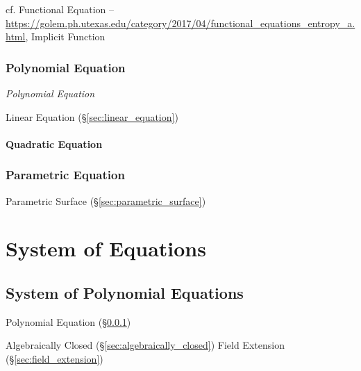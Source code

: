 cf. Functional Equation --
\url{https://golem.ph.utexas.edu/category/2017/04/functional_equations_entropy_a.html},
Implicit Function %



\subsubsection{Polynomial Equation}\label{sec:polynomial_equation}

\emph{Polynomial Equation}

Linear Equation (\S\ref{sec:linear_equation})



\paragraph{Quadratic Equation}\label{sec:quadratic_equation}\hfill



\subsubsection{Parametric Equation}\label{sec:parametric_equation}


Parametric Surface (\S\ref{sec:parametric_surface})



\section{System of Equations}\label{sec:system_of_equations}

\subsection{System of Polynomial Equations}
\label{sec:system_of_polynomials}

Polynomial Equation (\S\ref{sec:polynomial_equation})

Algebraically Closed (\S\ref{sec:algebraically_closed}) Field
Extension (\S\ref{sec:field_extension})



